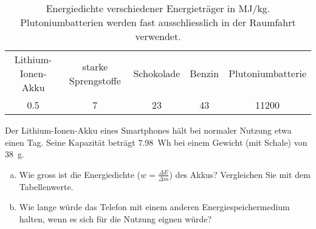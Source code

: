 
\begin{aufgabe}
	\begin{table}
		\centering
	\begin{tabular}{c|c|c|c|c}
	Lithium-Ionen-Akku & starke Sprengstoffe & Schokolade     & Benzin   & Plutoniumbatterie \\
	\num{0.5}          &  \num{7}            &\num{23}      & \num{43} & \num{11200}\\ 
		\end{tabular}
		\caption{Energiedichte verschiedener Energieträger in MJ/kg. Plutoniumbatterien werden fast ausschliesslich in der Raumfahrt verwendet.}
		\label{tab:energiedichte}
	\end{table}
	Der Lithium-Ionen-Akku eines Smartphones hält bei normaler Nutzung etwa einen Tag. 
	Seine Kapazität beträgt \SI{7.98}{Wh} bei einem Gewicht (mit Schale) von \SI{38}{g}.
	\begin{enumerate} [a)]
		\item Wie gross ist die Energiedichte ($w=\frac{\Delta E}{\Delta m}$) des Akkus? Vergleichen Sie mit dem Tabellenwerte.
		\item Wie lange würde das Telefon mit einem anderen Energiespeichermedium halten, wenn es sich für die Nutzung eignen würde?
	\end{enumerate}
\end{aufgabe}

